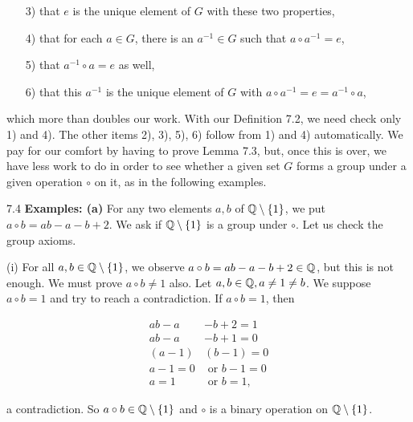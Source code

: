 \documentclass[11pt]{amsbook}
\begin{document}

    \begin{enumerate}
        \item[3)] that $e$ is the unique element of $G$ with these two properties,
        \item[4)] that for each $a\in G$, there is an $a^{-1}\in G$ such that $a\circ a^{-1}=e$,
        \item[5)] that $a^{-1}\circ a=e$ as well, 
        \item[6)] that this $a^{-1}$ is the unique element of $G$ with $a\circ a^{-1}=e =a^{-1}\circ a$,
    \end{enumerate}
    
    \begin{flushleft}
        which more than doubles our work. With our Definition 7.2, we need check only 1) and 4). The other items 2), 3), 5), 6) follow from 1) and 4) automatically. We pay for our comfort by having to prove Lemma 7.3, but, once this is over, we have less work to do in order to see whether a given set $G$ forms a group under a given operation $\circ$ on it, as in the following examples.
    \end{flushleft}
    
    \begin{flushleft}
        7.4 \textbf{Examples: (a)} For any two elements $a, b$ of $\mathbb{Q}\setminus \{1\}$, we put $a\circ b=ab -a -b +2$. We ask if $\mathbb{Q}\setminus\{1\}$ is a group under $\circ$. Let us check the group axioms.
    \end{flushleft}
    
    \hspace{15mm}(i) For all $a,b\in\mathbb{Q}\setminus\{1\}$, we observe $a\circ b=ab -a -b +2\in\mathbb{Q}$, but this is not enough. We must prove $a\circ b\neq 1$ also. Let $a,b\in\mathbb{Q}, a\neq 1\neq b$. We suppose $a\circ b= 1$ and try to reach a contradiction. If $a\circ b= 1$, then
    
    \vspace{-5mm}
    
    \begin{align*}
        ab-a&-b+2=1 \\
        ab-a&-b+1=0 \\
        (a-1)&(b-1)=0 \\
        a-1=0 &\text{ or } b-1=0 \\
        a=1 &\text{ or } b=1,
    \end{align*}
    
    \begin{flushleft}
        a contradiction. So $a\circ b\in\mathbb{Q}\setminus\{1\}$ and $\circ$ is a binary operation on $\mathbb{Q}\setminus\{1\}$.
    \end{flushleft}
    
\end{document}
